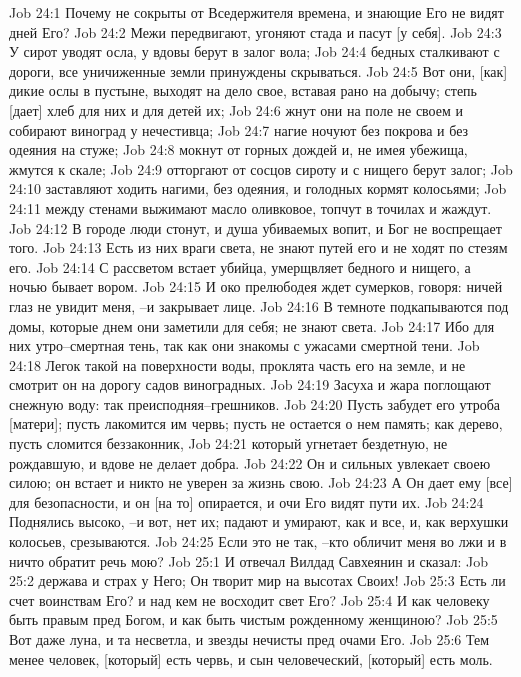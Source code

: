 Job 24:1  Почему не сокрыты от Вседержителя времена, и знающие Его не видят дней Его?
Job 24:2  Межи передвигают, угоняют стада и пасут [у себя].
Job 24:3  У сирот уводят осла, у вдовы берут в залог вола;
Job 24:4  бедных сталкивают с дороги, все уничиженные земли принуждены скрываться.
Job 24:5  Вот они, [как] дикие ослы в пустыне, выходят на дело свое, вставая рано на добычу; степь [дает] хлеб для них и для детей их;
Job 24:6  жнут они на поле не своем и собирают виноград у нечестивца;
Job 24:7  нагие ночуют без покрова и без одеяния на стуже;
Job 24:8  мокнут от горных дождей и, не имея убежища, жмутся к скале;
Job 24:9  отторгают от сосцов сироту и с нищего берут залог;
Job 24:10  заставляют ходить нагими, без одеяния, и голодных кормят колосьями;
Job 24:11  между стенами выжимают масло оливковое, топчут в точилах и жаждут.
Job 24:12  В городе люди стонут, и душа убиваемых вопит, и Бог не воспрещает того.
Job 24:13  Есть из них враги света, не знают путей его и не ходят по стезям его.
Job 24:14  С рассветом встает убийца, умерщвляет бедного и нищего, а ночью бывает вором.
Job 24:15  И око прелюбодея ждет сумерков, говоря: ничей глаз не увидит меня, --и закрывает лице.
Job 24:16  В темноте подкапываются под домы, которые днем они заметили для себя; не знают света.
Job 24:17  Ибо для них утро--смертная тень, так как они знакомы с ужасами смертной тени.
Job 24:18  Легок такой на поверхности воды, проклята часть его на земле, и не смотрит он на дорогу садов виноградных.
Job 24:19  Засуха и жара поглощают снежную воду: так преисподняя--грешников.
Job 24:20  Пусть забудет его утроба [матери]; пусть лакомится им червь; пусть не остается о нем память; как дерево, пусть сломится беззаконник,
Job 24:21  который угнетает бездетную, не рождавшую, и вдове не делает добра.
Job 24:22  Он и сильных увлекает своею силою; он встает и никто не уверен за жизнь свою.
Job 24:23  А Он дает ему [все] для безопасности, и он [на то] опирается, и очи Его видят пути их.
Job 24:24  Поднялись высоко, --и вот, нет их; падают и умирают, как и все, и, как верхушки колосьев, срезываются.
Job 24:25  Если это не так, --кто обличит меня во лжи и в ничто обратит речь мою?
Job 25:1  И отвечал Вилдад Савхеянин и сказал:
Job 25:2  держава и страх у Него; Он творит мир на высотах Своих!
Job 25:3  Есть ли счет воинствам Его? и над кем не восходит свет Его?
Job 25:4  И как человеку быть правым пред Богом, и как быть чистым рожденному женщиною?
Job 25:5  Вот даже луна, и та несветла, и звезды нечисты пред очами Его.
Job 25:6  Тем менее человек, [который] есть червь, и сын человеческий, [который] есть моль.
